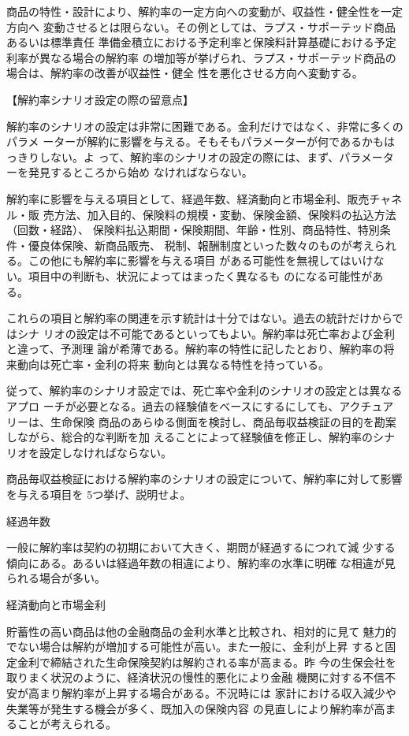 \documentclass[report,gutter=10mm,fore-edge=10mm,uplatex,dvipdfmx]{jlreq}
\begin{document}
商品の特性・設計により、解約率の一定方向への変動が、収益性・健全性を一定方向へ
変動させるとは限らない。その例としては、ラプス・サポーテッド商品あるいは標準責任
準備金積立における予定利率と保険料計算基礎における予定利率が異なる場合の解約率
の増加等が挙げられ、ラプス・サポーテッド商品の場合は、解約率の改善が収益性・健全
性を悪化させる方向へ変動する。

【解約率シナリオ設定の際の留意点】

解約率のシナリオの設定は非常に困難である。金利だけではなく、非常に多くのパラメ
ーターが解約に影響を与える。そもそもパラメーターが何であるかもはっきりしない。よ
って、解約率のシナリオの設定の際には、まず、パラメーターを発見するところから始め
なければならない。

解約率に影響を与える項目として、経過年数、経済動向と市場金利、販売チャネル・販
売方法、加入目的、保険料の規模・変動、保険金額、保険料の払込方法（回数・経路）、
保険料払込期間・保険期間、年齢・性別、商品特性、特別条件・優良体保険、新商品販売、
税制、報酬制度といった数々のものが考えられる。この他にも解約率に影響を与える項目
がある可能性を無視してはいけない。項目中の判断も、状況によってはまったく異なるも
のになる可能性がある。

これらの項目と解約率の関連を示す統計は十分ではない。過去の統計だけからではシナ
リオの設定は不可能であるといってもよい。解約率は死亡率および金利と違って、予測理
論が希薄である。解約率の特性に記したとおり、解約率の将来動向は死亡率・金利の将来
動向とは異なる特性を持っている。

従って、解約率のシナリオ設定では、死亡率や金利のシナリオの設定とは異なるアプロ
ーチが必要となる。過去の経験値をべースにするにしても、アクチュアリーは、生命保険
商品のあらゆる側面を検討し、商品毎収益検証の目的を勘案しながら、総合的な判断を加
えることによって経験値を修正し、解約率のシナリオを設定しなければならない。


商品毎収益検証における解約率のシナリオの設定について、解約率に対して影響を与える項目を 5つ挙げ、説明せよ。

\answer{}

経過年数

一般に解約率は契約の初期において大きく、期問が経過するにつれて減
少する傾向にある。あるいは経過年数の相違により、解約率の水準に明確
な相違が見られる場合が多い。

経済動向と市場金利

貯蓄性の高い商品は他の金融商品の金利水準と比較され、相対的に見て
魅力的でない場合は解約が増加する可能性が高い。また一般に、金利が上昇
すると固定金利で締結された生命保険契約は解約される率が高まる。昨
今の生保会社を取りまく状況のように、経済状況の慢性的悪化により金融
機関に対する不信不安が高まり解約率が上昇する場合がある。不況時には
家計における収入減少や失業等が発生する機会が多く、既加入の保険内容
の見直しにより解約率が高まることが考えられる。
\end{document}
